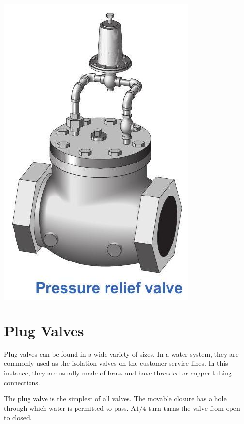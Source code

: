 \documentclass[10pt]{article}
\begin{document}
\includegraphics[max width=\textwidth]{PressureReliefValve}

\section{Plug Valves}
Plug valves can be found in a wide variety of sizes. In a water system, they are commonly used as the isolation valves on the customer service lines. In this instance, they are usually made of brass and have threaded or copper tubing connections.

The plug valve is the simplest of all valves. The movable closure has a hole through which water is permitted to pass. $\mathrm{A} 1 / 4$ turn turns the valve from open to closed.
\end{document}
